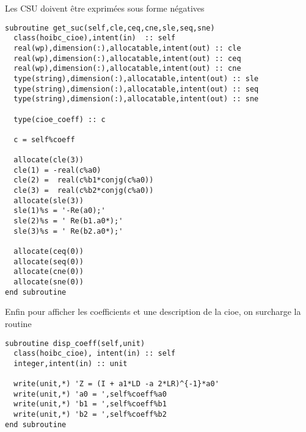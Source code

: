 Les CSU doivent être exprimées sous forme négatives
\begin{lstlisting}
subroutine get_suc(self,cle,ceq,cne,sle,seq,sne)
  class(hoibc_cioe),intent(in)  :: self
  real(wp),dimension(:),allocatable,intent(out) :: cle
  real(wp),dimension(:),allocatable,intent(out) :: ceq
  real(wp),dimension(:),allocatable,intent(out) :: cne
  type(string),dimension(:),allocatable,intent(out) :: sle
  type(string),dimension(:),allocatable,intent(out) :: seq
  type(string),dimension(:),allocatable,intent(out) :: sne

  type(cioe_coeff) :: c

  c = self%coeff

  allocate(cle(3))
  cle(1) = -real(c%a0)
  cle(2) =  real(c%b1*conjg(c%a0))
  cle(3) =  real(c%b2*conjg(c%a0))
  allocate(sle(3))
  sle(1)%s = '-Re(a0);'
  sle(2)%s = ' Re(b1.a0*);'
  sle(3)%s = ' Re(b2.a0*);'

  allocate(ceq(0))
  allocate(seq(0))
  allocate(cne(0))
  allocate(sne(0))
end subroutine
\end{lstlisting}

Enfin pour afficher les coefficients et une description de la cioe, on surcharge la routine
\begin{lstlisting}
subroutine disp_coeff(self,unit)
  class(hoibc_cioe), intent(in) :: self
  integer,intent(in) :: unit
  
  write(unit,*) 'Z = (I + a1*LD -a 2*LR)^{-1}*a0'
  write(unit,*) 'a0 = ',self%coeff%a0
  write(unit,*) 'b1 = ',self%coeff%b1
  write(unit,*) 'b2 = ',self%coeff%b2
end subroutine
\end{lstlisting}


